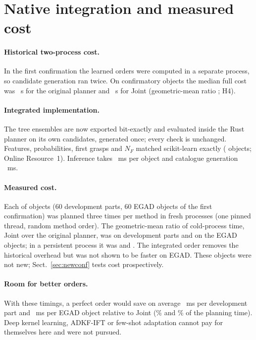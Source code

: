 \section{Native integration and measured cost}\label{sec:cost}

\paragraph{Historical two-process cost.} In the first confirmation the learned orders were computed in a separate process, so candidate generation ran twice. On \timeObjects{} confirmatory objects the median full cost was \timeMzero~s for the original planner and \timeJoint~s for Joint (geometric-mean ratio \confSSsixEff; H4).

\paragraph{Integrated implementation.} The tree ensembles are now exported bit-exactly and evaluated inside the Rust planner on its own candidates, generated once; every check is unchanged. Features, probabilities, first grasps and $N_F$ matched scikit-learn exactly (\natObjects{} objects; Online Resource~1). Inference takes \benchInferenceMs~ms per object and catalogue generation \benchGenerationMs~ms.

\paragraph{Measured cost.} Each of \benchAllObjects{} objects (60 development parts, 60 EGAD objects of the first confirmation) was planned three times per method in fresh processes (one pinned thread, random method order). The geometric-mean ratio of cold-process time, Joint over the original planner, was \benchDevCold{} \benchDevColdCI{} on development parts and \benchEgadCold{} \benchEgadColdCI{} on the EGAD objects; in a persistent process it was \benchDevWarm{} and \benchEgadWarm{} \benchEgadWarmCI. The integrated order removes the historical overhead but was not shown to be faster on EGAD. These objects were not new; Sect.~\ref{sec:newconf} tests cost prospectively.

\paragraph{Room for better orders.} With these timings, a perfect order would save on average \ceilDevMs~ms per development part and \ceilEgadMs~ms per EGAD object relative to Joint (\ceilDevShare\% and \ceilEgadShare\% of the planning time). Deep kernel learning, ADKF-IFT \cite{wilson2016dkl,chen2023adkfift} or few-shot adaptation cannot pay for themselves here and were not pursued.

